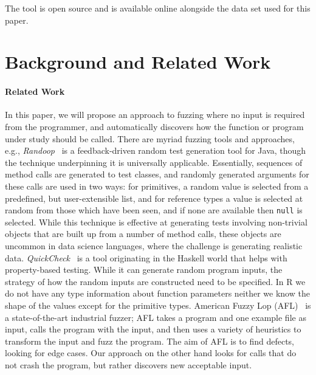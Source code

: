 \documentclass[sigplan,anonymous,review]{acmart}
\begin{document}
The tool is open source and is available online alongside the data set used for this paper.

\section{Background and Related Work}
\label{sec:background}

\paragraph{Related Work}

In this paper, we will propose an approach to fuzzing where no input is required from the programmer, and automatically discovers how the function or program under study should be called.
There are myriad fuzzing tools and approaches, e.g., \emph{Randoop}~\cite{pacheco2007randoop} is a feedback-driven random test generation tool for Java, though the technique underpinning it is universally applicable.
Essentially, sequences of method calls are generated to test classes, and randomly generated arguments for these calls are used in two ways: for primitives, a random value is selected from a predefined, but user-extensible list, and for reference types a value is selected at random from those which have been seen, and if none are available then {\tt null} is selected.
While this technique is effective at generating tests involving non-trivial objects that are built up from a number of method calls, these objects are uncommon in data science languages, where the challenge is generating realistic data.
\emph{QuickCheck}~\cite{quickcheck} is a tool originating in the Haskell world that helps with property-based testing.
While it can generate random program inputs, the strategy of how the random inputs are constructed need to be specified.
In R we do not have any type information about function parameters neither we know the shape of the values except for the primitive types.
American Fuzzy Lop (AFL)~\cite{afl} is a state-of-the-art industrial fuzzer; AFL takes a program and one example file as input, calls the program with the input, and then uses a variety of heuristics to transform the input and fuzz the program. The aim of AFL is to find defects, looking for edge cases.
Our approach on the other hand looks for calls that do not crash the program, but rather discovers new acceptable input.
\end{document}
